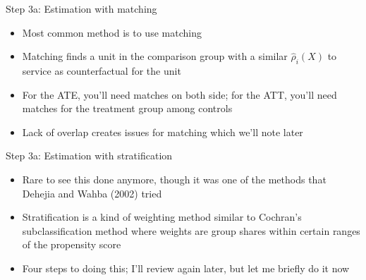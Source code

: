 \documentclass{beamer}
\begin{document}
\begin{frame}{Step 3a: Estimation  with matching}

\begin{itemize}
	
	\item Most common method is to use matching
	\item Matching finds a unit in the comparison group with a similar $\widehat{\rho}_i(X)$ to service as counterfactual for the unit
	\item For the ATE, you'll need matches on both side; for the ATT, you'll need matches for the treatment group among controls
	\item Lack of overlap creates issues for matching which we'll note later
	
\end{itemize}

\end{frame}


\begin{frame}{Step 3a: Estimation with stratification}

\begin{itemize}
	
	\item Rare to see this done anymore, though it was one of the methods that Dehejia and Wahba (2002) tried
	\item Stratification is a kind of weighting method similar to Cochran's subclassification method where weights are group shares within certain ranges of the propensity score
	\item Four steps to doing this; I'll review again later, but let me briefly do it now
	
\end{itemize}

\end{frame}
\end{document}
